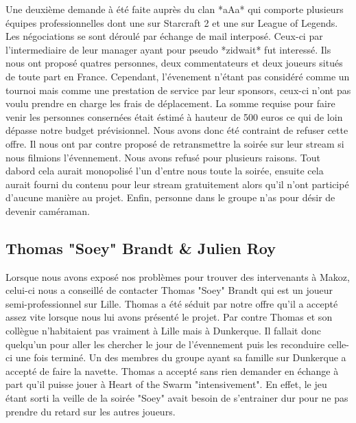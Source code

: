 Une deuxième demande à été faite auprès du clan *aAa* qui comporte
plusieurs équipes professionnelles dont une sur Starcraft 2 et une sur
League of Legends. Les négociations se sont déroulé par échange de mail
interposé.  Ceux-ci par l'intermediaire de leur manager ayant pour
pseudo *zidwait* fut interessé. Ils nous ont proposé quatres personnes,
deux commentateurs et deux joueurs situés de toute part en France.
Cependant, l'évenement n'étant pas considéré comme un tournoi mais comme
une prestation de service par leur sponsors, ceux-ci n'ont pas voulu
prendre en charge les frais de déplacement. La somme requise pour faire
venir les personnes consernées était éstimé à hauteur de 500 euros ce
qui de loin dépasse notre budget prévisionnel. Nous avons donc été
contraint de refuser cette offre. Il nous ont par contre proposé de
retransmettre la soirée sur leur stream si nous filmions l'évennement.
Nous avons refusé pour plusieurs raisons. Tout dabord cela aurait
monopolisé l'un d'entre nous toute la soirée, ensuite cela aurait fourni
du contenu pour leur stream gratuitement alors qu'il n'ont participé
d'aucune manière au projet. Enfin, personne dans le groupe n'as pour
désir de devenir caméraman.

\subsection{Thomas "Soey" Brandt \& Julien Roy}%
\label{sub:tthomas_soey_brandt_&_julien_roy}

Lorsque nous avons exposé nos problèmes pour trouver des intervenants à
Makoz, celui-ci nous a conseillé de contacter Thomas "Soey" Brandt qui
est un joueur semi-professionnel sur Lille. Thomas a été séduit par
notre offre qu'il a accepté assez vite lorsque nous lui avons présenté
le projet. Par contre Thomas et son collègue n'habitaient pas vraiment à
Lille mais à Dunkerque. Il fallait donc quelqu'un pour aller les
chercher le jour de l'évennement puis les reconduire celle-ci une fois
terminé. Un des membres du groupe ayant sa famille sur Dunkerque a
accepté de faire la navette. Thomas a accepté sans rien demander en
échange à part qu'il puisse jouer à Heart of the Swarm "intensivement".
En effet, le jeu étant sorti la veille de la soirée "Soey" avait besoin
de s'entrainer dur pour ne pas prendre du retard sur les autres joueurs.


